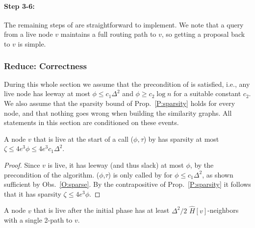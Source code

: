 \paragraph{Step 3-6:}
The remaining steps of  are straightforward to implement. We note that a query from a live node $v$ maintains a full routing path to $v$, so getting a proposal back to $v$ is simple.

\subsubsection{Reduce: Correctness}
During this whole section we assume that the precondition of  is satisfied, i.e., any live node has leeway at most $\phi \le c_1 \Delta^2$ and $\phi\geq c_2\log n$ for a suitable constant $c_2$. 
We also assume that the sparsity bound of Prop.~\ref{P:sparsity} holds for every node, and that nothing goes wrong when building the similarity graphs.
All statements in this section are conditioned on these events.


\begin{observation}
A node $v$ that is live at the start of a call ($\phi,\tau$) by  has sparsity at most $\zeta \le 4e^3\phi \le 4e^3 c_1 \Delta^2$.
\label{O:livesparse}
\end{observation}

\begin{proof}
Since $v$ is live, it has leeway (and thus slack) at most $\phi$, by the precondition of the algorithm. 
($\phi$,$\tau$) is only called by  for $\phi \le c_1 \Delta^2$, as shown sufficient by Obs.~\ref{O:sparse}.
By the contrapositive of
Prop.~\ref{P:sparsity} it follows that it has sparsity $\zeta \le 4 e^3 \phi$.
\end{proof}

\begin{lemma}
A node $v$ that is live after the initial phase has at least $\Delta^2/2$ $\hat{H}[v]$-neighbors with a single 2-path to $v$.
\label{L:hat-neighbors}
\end{lemma}

